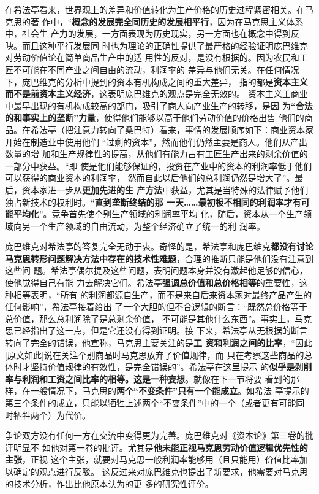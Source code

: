 在希法亭看来，世界观上的差异和价值转化为生产价格的历史过程紧密相关。在马克思的著
作中，“\textbf{概念的发展完全同历史的发展相平行}，因为在马克思主义体系中，社会生
产力的发展，一方面表现为历史现实，另一方面也在概念中得到反映。而且这种平行发展同
时也为理论的正确性提供了最严格的经验证明庞巴维克对劳动价值论在简单商品生产中的适
用性的反对，是没有根据的。因为农民和工匠不可能在不同产业之间自由的流动，利润率的
差异与他们无关。在任何情况下，庞巴维克的分析中提到的资本有机构成之间的重大差异，
指的都是\textbf{资本主义而不是前资本主义经济}，这表明庞巴维克的观点是完全无效的。
资本主义工商业中最早出现的有机构成较高的部门，吸引了商人向产业生产的转移，是因
为\textbf{“合法的和事实上的垄断”力量}，使得他们能够以高于他们劳动价值的价格出售
他们的商品。在希法亭（把注意力转向了桑巴特）看来，事情的发展顺序如下：商业资本家
开始在制造业中使用他们 “过剩的资本”，然而他们仍然主要是商人。他们从产出数量的增
加和生产规律性的提高，从他们有能力占有工匠生产出来的剩余价值的一部分中获益。“即
使是他们能够保证的，投资在产业中的资本的利润率低于他们可以获得的商业资本的利润率，
然而自此以后他们的总利润仍然是增大了”。最后，资本家进一步从\textbf{更加先进的生
  产方法}中获益，尤其是当特殊的法律赋予他们独占新技术的权利时。“\textbf{直到垄断终结的那
一天……最初极不相同的利润率才有可能平均化}”。竞争首先使个别生产领域的利润率平均
化，随后，资本从一个生产领域向另一个生产领域的自由流动，为整个经济确立了统一的利
润率。

庞巴维克对希法亭的答复完全无动于衷。奇怪的是，希法亭和庞巴维克\textbf{都没有讨论
  马克思转形问题解决方法中存在的技术性难题}，合理的推断只能是他们没有注意到这些问
题。希法亭偶尔提及这些问题，表明问题本身并没有激起他足够的信心，使他觉得自己有能
力去解决它们。希法亭\textbf{强调总价值和总价格相等}的重要性，这种相等表明，“所有
的利润都源自生产，而不是来自后来资本家对最终产品产生的任何影响”，希法亭接着给出
了一个大胆的但不合逻辑的断言：“既然总价格等于总价值，那么总利润除了是总剩余价值，
不可能是其他什么东西”。事实上，马克思已经指出了这一点，但是它还没有得到证明。接
下来，希法亭从无根据的断言转向了完全的错误，他宣称，马克思主要关注的是\textbf{工
  资和利润之间的比率}，“因此[原文如此]说在关注个别商品时马克思放弃了价值规律，而
只在考察这些商品的总体时才坚持价值规律的有效性，是完全错误的”。希法亭在这里提示
的\textbf{似乎是剥削率与利润和工资之间比率的相等。这是一种妄想}。就像在下一节将要
看到的那样，在一般情况下，马克思的\textbf{两个“不变条件”只有一个能成立}。如希法
亭提示的第三个条件的成立，只能以牺牲上述两个“不变条件”中的一个（或者更有可能同
时牺牲两个）为代价。

争论双方没有任何一方在交流中变得更为完善。庞巴维克对《资本论》第三卷的批评明显不
如他对第一卷的批评。尤其是\textbf{他未能正视马克思劳动价值逻辑优先性的主张}，正视
这个主张，就要对马克思一般利润率能够用（且只能用）价值比率加以确定的观点进行反驳。
这反过来对庞巴维克也提出了新要求，他需要对马克思的技术分析，作出比他原本认为的更
多的研究性评价。

